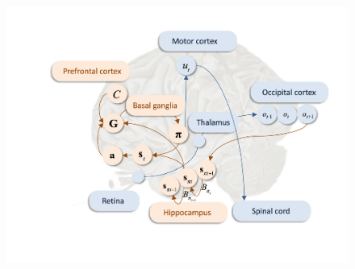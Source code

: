 \documentclass[review,12pt,authoryear]{elsarticle}
\begin{document}
\begin{figure}
    \centering
    \includegraphics[width=\textwidth]{FigureBrain.png}
\end{figure}
\end{document}

